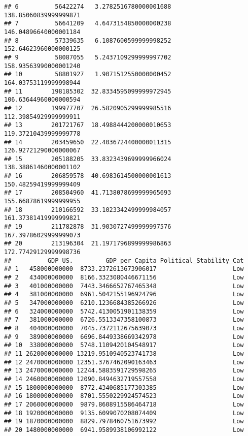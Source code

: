 \documentclass[
]{article}
\begin{document}
\begin{verbatim}
## 6          56422274   3.2782516780000001688          138.85060839999999871
## 7          56641209   4.6473154850000000238          146.04896640000001184
## 8          57339635   6.1087600599999998252          152.64623960000000125
## 9          58087055   5.2437109299999997702          158.93563990000001240
## 10         58801927   1.9071512550000000452          164.03753119999998944
## 11        198185302  32.8334595099999972945          106.63644960000000594
## 12        199977707  26.5820905299999985516          112.39854929999999911
## 13        201721767  18.4988444200000010653          119.37210439999999778
## 14        203459650  22.4036724400000011315          126.92721290000000067
## 15        205188205  33.8323439699999966024          138.38861460000001102
## 16        206859578  40.6983614500000001613          150.48259419999999409
## 17        208504960  41.7138078699999965693          155.66878619999999955
## 18        210166592  33.1023342499999984057          161.37381419999999821
## 19        211782878  31.9030727499999997576          167.39786029999999073
## 20        213196304  21.1971796899999986863          172.77429129999998736
##          GDP_US.         GDP_per_Capita Political_Stability_Cat
## 1   458000000000  8733.2372613673906017                     Low
## 2   434000000000  8166.3323080446671156                     Low
## 3   401000000000  7443.3466652767465348                     Low
## 4   381000000000  6961.5042155196924796                     Low
## 5   347000000000  6210.1236684385266926                     Low
## 6   324000000000  5742.4130051901138359                     Low
## 7   381000000000  6726.5513347358100873                     Low
## 8   404000000000  7045.7372112675639073                     Low
## 9   389000000000  6696.8449338669342978                     Low
## 10  338000000000  5748.1109420104548917                     Low
## 11 2620000000000 13219.9510940523741738                     Low
## 12 2470000000000 12351.3767462090163463                     Low
## 13 2470000000000 12244.5883591729598265                     Low
## 14 2460000000000 12090.8494632719557558                     Low
## 15 1800000000000  8772.4340685177303385                     Low
## 16 1800000000000  8701.5550229924574523                     Low
## 17 2060000000000  9879.8608915586464718                     Low
## 18 1920000000000  9135.6099070208074409                     Low
## 19 1870000000000  8829.7978460751673992                     Low
## 20 1480000000000  6941.9589938106992122                     Low
\end{verbatim}
\end{document}
